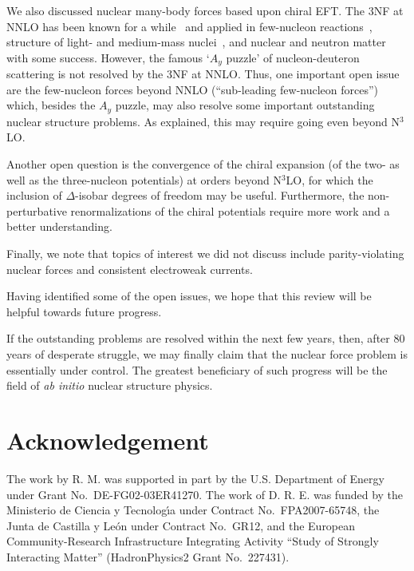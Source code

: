 \documentclass[sort&compress,preprint,3p]{elsarticle}
\begin{document}
We also discussed nuclear many-body forces based upon chiral EFT.
The 3NF at NNLO has been known for a while~\cite{Kol94,Epe02b} and
applied in 
few-nucleon reactions~\cite{Epe02b,Erm05,Kis05,Wit06,Ley06,Ste07,KE07,Mar09,Kie10,Viv10},
structure of light- and medium-mass nuclei~\cite{Nog06,Nav07,Hag07,Ots09},
and nuclear and neutron matter~\cite{Bog05,HS09} with some success.
However, the famous `$A_y$ puzzle' of nucleon-deuteron
scattering is not resolved by the 3NF at NNLO. 
Thus, one important open issue
are the few-nucleon forces beyond NNLO (``sub-leading
few-nucleon forces'') which, besides the $A_y$ puzzle, may also
resolve some important outstanding
nuclear structure problems. As explained, this may require going even beyond N$^3$LO.

Another open question is the convergence of the chiral expansion (of the two- as well as
the three-nucleon potentials) at orders beyond N$^3$LO,
for which the inclusion of $\Delta$-isobar degrees of freedom may be useful.
Furthermore, the non-perturbative renormalizations of the chiral potentials
require more work and a better understanding. 

Finally, we note that topics of interest we did not discuss 
include parity-violating nuclear forces and consistent electroweak
currents.

Having identified some of the open issues, we hope that this review will
be helpful towards future progress.

If the outstanding problems are resolved within the next few years,
then, after 80 years of desperate struggle, we
may finally claim that the nuclear force problem is essentially under control.
The greatest beneficiary of such progress will be the field of {\it ab initio} nuclear
structure physics. 

\section*{Acknowledgement}
The work by R. M. was supported in part by the U.S. Department of Energy
under Grant No.~DE-FG02-03ER41270.
The work of D. R. E. was funded by the Ministerio de Ciencia y
Tecnolog\'\i a under Contract No.~FPA2007-65748, the Junta de Castilla
y Le\'on under Contract No.~GR12,  and
the European Community-Research Infrastructure Integrating
Activity ``Study of Strongly Interacting Matter'' (HadronPhysics2
Grant No.~227431).

\appendix

\setcounter{figure}{0}
\setcounter{table}{0}
\end{document}
